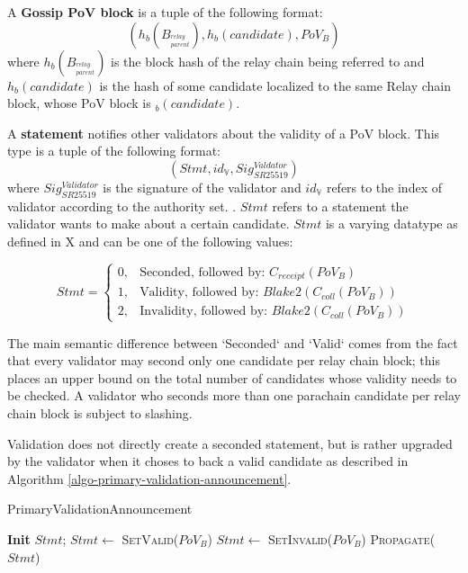 \begin{definition}
  \label{defn-pov-block}
  A \textbf{Gossip PoV block} is a tuple of the following format:
  \[
  (h_b(B_{^{relay}_{parent}}), h_b(candidate), PoV_B)
  \]
  where $h_b(B_{^{relay}_{parent}})$ is the block hash of the relay chain being
  referred to and $h_b(candidate)$ is the hash of some candidate localized to
  the same Relay chain block, whose PoV block is $_b(candidate)$.
\end{definition}

\begin{definition}
  \label{defn-gossip-statement}
  A \textbf{statement} notifies other validators about the validity of a PoV block.
  This type is a tuple of the following format:
  \[
  (Stmt, id_{\mathbb{V}}, Sig^{Valdator}_{SR25519})
  \]
  where $Sig^{Validator}_{SR25519}$ is the signature of the validator and
  $id_{\mathbb{V}}$ refers to the index of validator according to the authority
  set. . $Stmt$
  refers to a statement the validator wants to make about a certain candidate.
  $Stmt$ is a varying datatype as defined in X  and can be one
  of the following values:

\begin{equation}
  Stmt =
  \begin{cases}
    0, & \text{Seconded, followed by: } C_{receipt}(PoV_B) \\
    1, & \text{Validity, followed by: } Blake2(C_{coll}(PoV_B)) \\
    2, & \text{Invalidity, followed by: } Blake2(C_{coll}(PoV_B))
  \end{cases}
\end{equation}
\end{definition}

The main semantic difference between `Seconded` and `Valid` comes from the fact
that every validator may second only one candidate per relay chain block; this
places an upper bound on the total number of candidates whose validity needs to
be checked. A validator who seconds more than one parachain candidate per relay
chain block is subject to slashing.
\newline

Validation does not directly create a seconded statement, but is rather upgraded
by the validator when it choses to back a valid candidate as described in
Algorithm \ref{algo-primary-validation-announcement}.

\begin{algorithm}[H]
  \caption[PrimaryValidationAnnouncement]{\sc PrimaryValidationAnnouncement}
  \label{algo-primary-validation-announcement}
  \begin{algorithmic}[1]
      \State \textbf{Init} $Stmt$;
        \State $Stmt \leftarrow$ \textsc{SetValid($PoV_B$)}
      \Else
        \State $Stmt \leftarrow$ \textsc{SetInvalid($PoV_B$)}
      \EndIf
      \State \textsc{Propagate}($Stmt$)
  \end{algorithmic}
\end{algorithm}

